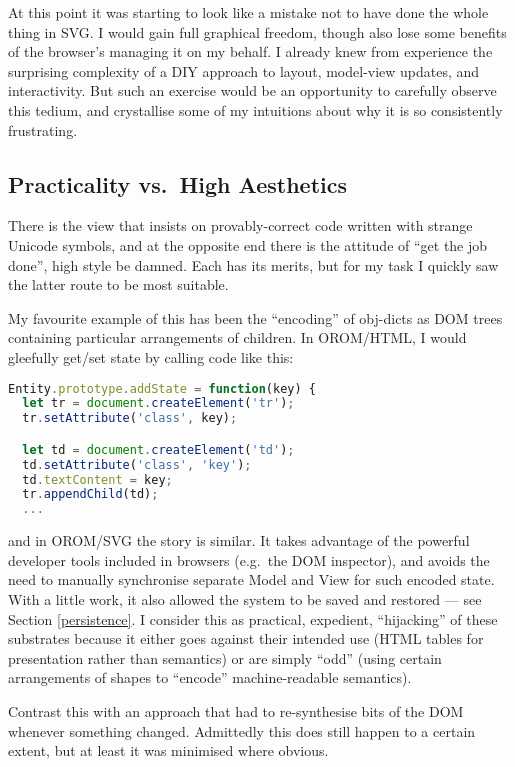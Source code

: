 At this point it was starting to look like a mistake not to have done
the whole thing in SVG. I would gain full graphical freedom, though also
lose some benefits of the browser's managing it on my behalf. I already
knew from experience the surprising complexity of a DIY approach to
layout, model-view updates, and interactivity. But such an exercise
would be an opportunity to carefully observe this tedium, and
crystallise some of my intuitions about why it is so consistently
frustrating.

\hypertarget{practicality-vs.-high-aesthetics}{%
\subsection{Practicality vs.~High
Aesthetics}\label{practicality-vs.-high-aesthetics}}

There is the view that insists on provably-correct code written with
strange Unicode symbols, and at the opposite end there is the attitude
of ``get the job done'', high style be damned. Each has its merits, but
for my task I quickly saw the latter route to be most suitable.

My favourite example of this has been the ``encoding'' of obj-dicts as
DOM trees containing particular arrangements of children. In OROM/HTML,
I would gleefully get/set state by calling code like this:

\begin{lstlisting}[language=JavaScript]
Entity.prototype.addState = function(key) {
  let tr = document.createElement('tr');
  tr.setAttribute('class', key);

  let td = document.createElement('td');
  td.setAttribute('class', 'key');
  td.textContent = key;
  tr.appendChild(td);
  ...
\end{lstlisting}

and in OROM/SVG the story is similar. It takes advantage of the powerful
developer tools included in browsers (e.g.~the DOM inspector), and
avoids the need to manually synchronise separate Model and View for such
encoded state. With a little work, it also allowed the system to be
saved and restored --- see Section \ref{persistence}. I consider this as
practical, expedient, ``hijacking'' of these substrates because it
either goes against their intended use (HTML tables for presentation
rather than semantics) or are simply ``odd'' (using certain arrangements
of shapes to ``encode'' machine-readable semantics).

Contrast this with an approach that had to re-synthesise bits of the DOM
whenever something changed. Admittedly this does still happen to a
certain extent, but at least it was minimised where obvious.

